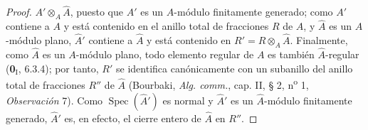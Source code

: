 \begin{proof}
$A'\otimes_A\widehat A$, puesto que $A'$ es un $A$-módulo finitamente
generado; como $A'$ contiene a $A$ y está contenido en el anillo total
de fracciones $R$ de $A$, y $\widehat A$ es un $A$-módulo plano,
$\widehat{A}'$ contiene a $\widehat A$ y está contenido en
$R'=R\otimes_A\widehat A$. Finalmente, como $\widehat A$ es un
$A$-módulo plano, todo elemento regular de $A$ es también
$\widehat A$-regular (\textbf 0$_{\mathrm I}$, 6.3.4); por tanto, $R'$ se
identifica canónicamente con un subanillo del anillo total de fracciones
$R''$ de $\widehat A$ (Bourbaki, \emph{Alg. comm.}, cap. II, § 2,
n\textsuperscript{o} 1, \emph{Observación} 7). Como
$\operatorname{Spec}(\widehat{A}')$ es normal y $\widehat{A}'$ es un
$\widehat A$-módulo finitamente generado, $\widehat{A}'$ es, en efecto,
el cierre entero de $\widehat A$ en $R''$.
\end{proof}
